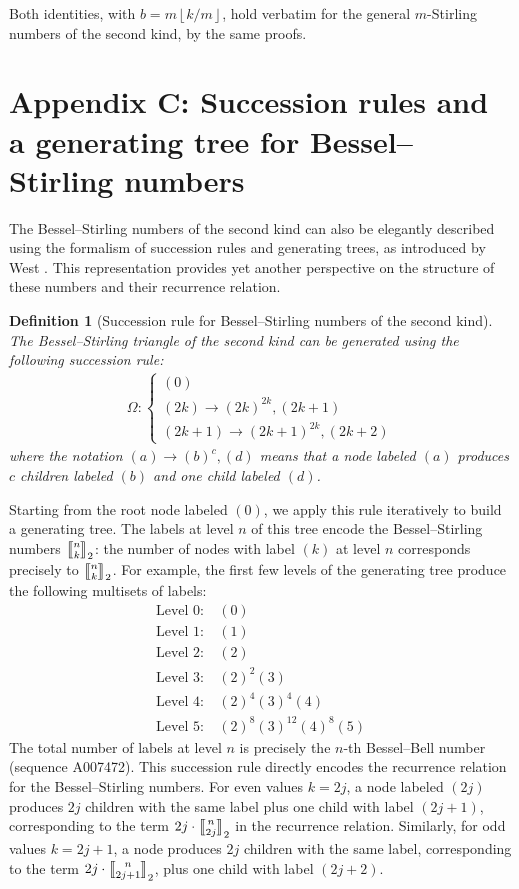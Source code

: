\documentclass[a4paper]{amsart}
\numberwithin{equation}{section}
\newcommand{\mStirling}[0]{\genfrac{\llbracket}{\rrbracket}{0pt}{}}
\newcommand{\floor}[1]{\left\lfloor #1 \right\rfloor}
\newtheorem{definition}[theorem]{Definition}
\begin{document}
Both identities, with $b = m\floor{k/m}$, hold verbatim for the general $m$-Stirling numbers of the second kind, by the same proofs.

\pagebreak
\section*{Appendix C: Succession rules and a generating tree for Bessel--Stirling numbers}
\noindent The Bessel--Stirling numbers of the second kind can also be elegantly described using the formalism of succession rules and generating trees, as introduced by West \cite{west_generating_1995}. This representation provides yet another perspective on the structure of these numbers and their recurrence relation.
\begin{definition}[Succession rule for Bessel--Stirling numbers of the second kind]
The Bessel--Stirling triangle of the second kind can be generated using the following succession rule:
\[
    \begin{aligned}
        \Omega: \begin{cases}
        (0) \\
        (2k) \to (2k)^{2k}, (2k+1) \\
        (2k+1) \to (2k+1)^{2k}, (2k+2)
        \end{cases}
    \end{aligned}
\]
where the notation $(a) \to (b)^c , (d)$ means that a node labeled $(a)$ produces $c$ children labeled $(b)$ and one child labeled $(d)$.
\end{definition}
Starting from the root node labeled $(0)$, we apply this rule iteratively to build a generating tree. The labels at level $n$ of this tree encode the Bessel--Stirling numbers $\mStirling{n}{k}_2$: the number of nodes with label $(k)$ at level $n$ corresponds precisely to $\mStirling{n}{k}_2$.
For example, the first few levels of the generating tree produce the following multisets of labels:
\[
    \begin{aligned}
    \text{Level 0}: &\ {(0)} \\
    \text{Level 1}: &\ {(1)} \\
    \text{Level 2}: &\ {(2)} \\
    \text{Level 3}: &\ {(2)^2(3)} \\
    \text{Level 4}: &\ {(2)^4(3)^4(4)} \\
    \text{Level 5}: &\ {(2)^8(3)^{12}(4)^8(5)} 
    \end{aligned}
\]
The total number of labels at level $n$ is precisely the $n$-th Bessel--Bell number (sequence A007472). This succession rule directly encodes the recurrence relation for the Bessel--Stirling numbers. For even values $k = 2j$, a node labeled $(2j)$ produces $2j$ children with the same label plus one child with label $(2j+1)$, corresponding to the term $2j \cdot \mStirling{n}{2j}_2$ in the recurrence relation. Similarly, for odd values $k = 2j+1$, a node produces $2j$ children with the same label, corresponding to the term $2j \cdot \mStirling{n}{2j+1}_2$, plus one child with label $(2j+2)$.
\end{document}
